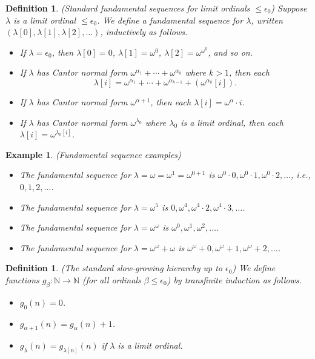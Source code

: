 \documentclass{article}
\newtheorem{definition}[theorem]{Definition}
\newtheorem{example}[theorem]{Example}
\begin{document}
\begin{definition}
\label{fundsequencesdefn}
    (Standard fundamental sequences for limit ordinals $\leq\epsilon_0$)
    Suppose $\lambda$ is a limit ordinal $\leq\epsilon_0$. We define a
    \emph{fundamental sequence for $\lambda$},
    written $(\lambda[0],\lambda[1],\lambda[2],\ldots)$, inductively as follows.
    \begin{itemize}
        \item
        If $\lambda=\epsilon_0$, then $\lambda[0]=0$,
        $\lambda[1]=\omega^0$, $\lambda[2]=\omega^{\omega^0}$, and so on.
        \item
        If $\lambda$ has Cantor normal form
        $\omega^{\alpha_1}+\cdots+\omega^{\alpha_k}$ where $k>1$,
        then
        each
        \[
            \lambda[i] = \omega^{\alpha_1}+\cdots+\omega^{\alpha_{k-1}}
            + (\omega^{\alpha_k}[i]).
        \]
        \item
        If $\lambda$ has Cantor normal form $\omega^{\alpha+1}$,
        then each $\lambda[i]=\omega^{\alpha}\cdot i$.
        \item
        If $\lambda$ has Cantor normal form $\omega^{\lambda_0}$ where $\lambda_0$
        is a limit ordinal, then each $\lambda[i]=\omega^{\lambda_0[i]}$.
    \end{itemize}
\end{definition}

\begin{example}
    (Fundamental sequence examples)
    \begin{itemize}
        \item
        The fundamental sequence for $\lambda=\omega=\omega^1=\omega^{0+1}$ is
        $\omega^0\cdot 0, \omega^0\cdot 1, \omega^0\cdot 2, \ldots$,
        i.e., $0, 1, 2, \ldots$.
        \item
        The fundamental sequence for $\lambda=\omega^5$ is
        $0,\omega^4,\omega^4\cdot 2,\omega^4\cdot 3,\ldots$.
        \item
        The fundamental sequence for $\lambda=\omega^\omega$ is
        $\omega^0,\omega^1,\omega^2,\ldots$.
        \item
        The fundamental sequence for $\lambda=\omega^\omega+\omega$ is
        $\omega^\omega+0,\omega^\omega+1,\omega^\omega+2,\ldots$.
    \end{itemize}
\end{example}

\begin{definition}
\label{slowgrowinghierarchydefn}
    (The standard slow-growing hierarchy up to $\epsilon_0$)
    We define functions $g_\beta:\mathbb N\to\mathbb N$ (for all ordinals
    $\beta\leq \epsilon_0$) by transfinite induction as follows.
    \begin{itemize}
        \item
        $g_0(n)=0$.
        \item
        $g_{\alpha+1}(n) = g_\alpha(n) + 1$.
        \item
        $g_{\lambda}(n) = g_{\lambda[n]}(n)$ if $\lambda$ is a limit ordinal.
    \end{itemize}
\end{definition}
\end{document}
